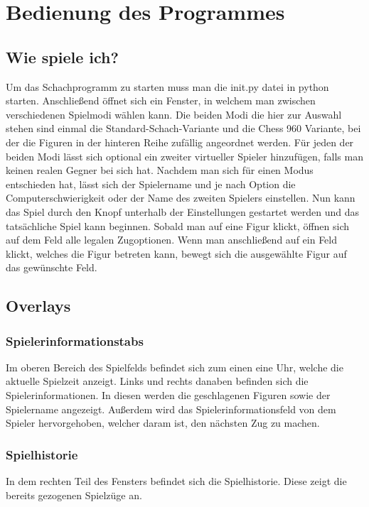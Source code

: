 \documentclass[a4paper, 10pt]{scrartcl}
\begin{document}
\section{Bedienung des Programmes}
\subsection{Wie spiele ich?}
Um das Schachprogramm zu starten muss man die init.py datei in python starten. Anschließend öffnet sich ein Fenster, in welchem man zwischen verschiedenen Spielmodi
wählen kann. Die beiden Modi die hier zur Auswahl stehen sind einmal die Standard-Schach-Variante und die Chess 960 Variante, bei der die Figuren in der hinteren Reihe
zufällig angeordnet werden.
Für jeden der beiden Modi lässt sich optional ein zweiter virtueller Spieler hinzufügen, falls man keinen realen Gegner bei sich hat.
Nachdem man sich für einen Modus entschieden hat, lässt sich der Spielername und je nach Option die Computerschwierigkeit oder der Name des zweiten Spielers einstellen.
Nun kann das Spiel durch den Knopf unterhalb der Einstellungen gestartet werden und das tatsächliche Spiel kann beginnen.
Sobald man auf eine Figur klickt, öffnen sich auf dem Feld alle legalen Zugoptionen. Wenn man anschließend auf ein Feld klickt, welches die Figur betreten kann, bewegt
sich die ausgewählte Figur auf das gewünschte Feld.

\subsection{Overlays}

\subsubsection{Spielerinformationstabs}
Im oberen Bereich des Spielfelds befindet sich zum einen eine Uhr, welche die aktuelle Spielzeit anzeigt. Links und rechts danaben befinden sich die Spielerinformationen.
In diesen werden die geschlagenen Figuren sowie der Spielername angezeigt. Außerdem wird das Spielerinformationsfeld von dem Spieler hervorgehoben, welcher daram ist, den
nächsten Zug zu machen.

\subsubsection{Spielhistorie}
In dem rechten Teil des Fensters befindet sich die Spielhistorie. Diese zeigt die bereits gezogenen Spielzüge an. 
\end{document}
